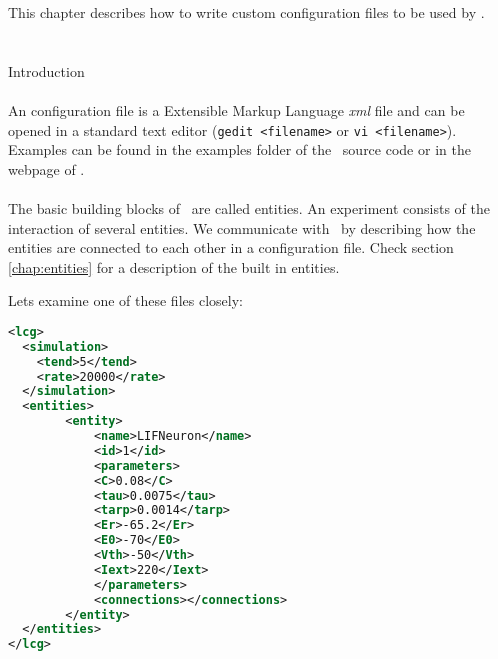 This chapter describes how to write custom configuration files to be
used by \progname.

\section{}Introduction
\paragraph{}
An \progname configuration file is a Extensible Markup Language \emph{xml} file and can be opened in a standard text editor (\texttt{gedit <filename>} or \texttt{vi <filename>}). Examples can be found in the examples folder of the \progname\ source code or in the webpage of \href{http://www.tnb.ua.ac.be}{\progname}.

\paragraph{}
The basic building blocks of \progname\ are called entities. An experiment consists of the interaction of several entities. We communicate with \progname\ by describing how the entities are connected to each other in a configuration file. Check section \ref{chap:entities} for a description of the built in entities.

Lets examine one of these files closely:

\renewcommand{\lstlistingname}{Example}
\begin{lstlisting}[caption={A simple example of a configuration file with a simulated integrate and fire neuron.},label={gettingStarted:example0},language=XML,morekeywords={dynamic clamp,entities,entity,name,id,C,tau,tarp,Er,E0,Vth,Iext,parameters,connections,simulation,tend,rate}]
<lcg>
  <simulation>
  	<tend>5</tend>
   	<rate>20000</rate>
  </simulation>
  <entities>
    	<entity>
      		<name>LIFNeuron</name>
      		<id>1</id>
      		<parameters>
			<C>0.08</C>
			<tau>0.0075</tau>
			<tarp>0.0014</tarp>
			<Er>-65.2</Er>
			<E0>-70</E0>
			<Vth>-50</Vth>
			<Iext>220</Iext>
      		</parameters>
      		<connections></connections>
    	</entity>
  </entities>
</lcg>

\end{lstlisting}
 
